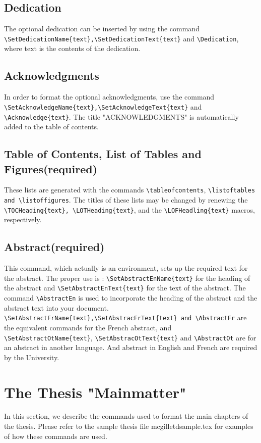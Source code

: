 \documentclass[12pt,Bold,letterpaper,TexShade]{mcgilletdclass}
\begin{document}
\section{Dedication}
The optional dedication can be inserted by using the command 
\verb=\SetDedicationName{text},\SetDedicationText{text}= and
\verb=\Dedication=, where text is the contents of the dedication.
\section{Acknowledgments}
In order to format the optional acknowledgments, use the command 
\verb=\SetAcknowledgeName{text},\SetAcknowledgeText{text}= and
\verb=\Acknowledge{text}=. The title "ACKNOWLEDGMENTS" is automatically
added to the table of contents. 
\section{Table of Contents, List of Tables and Figures(required)}
These lists are generated with the commands \verb=\tableofcontents=,
\verb=\listoftables and \listoffigures=. The titles of these lists may
be changed by renewing the \verb=\TOCHeading{text}, \LOTHeading{text}=, and
the \verb=\LOFHeadling{text}= macros, respectively.
\section{Abstract(required)}
This command, which actually is an environment, sets up the required 
text for the abstract. The proper use is : \verb=\SetAbstractEnName{text}=
for the heading of the abstract and \verb=\SetAbstractEnText{text}= for the 
text of the abstract. The command \verb=\AbstractEn= is used to incorporate 
the heading of the abstract and the abstract text into your document.
\verb=\SetAbstractFrName{text},\SetAbstracFrText{text} and \AbstractFr= are the
equivalent commands for the French abstract, and \verb=\SetAbstractOtName{text}=, 
\verb=\SetAbstracOtText{text}= and \verb=\AbstractOt= are for an abstract in 
another language. And abstract in English and French are required by the University.


\chapter{The Thesis "Mainmatter"}
In this section, we describe the commands used to format the
main chapters of the thesis. Please refer to the sample thesis file
mcgilletdsample.tex for examples of how these commands are used.
\end{document}
